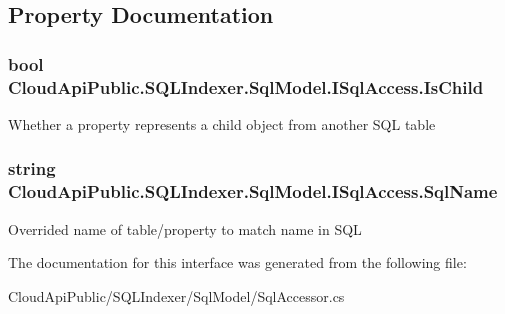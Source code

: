 \subsection{Property Documentation}
\hypertarget{interface_cloud_api_public_1_1_s_q_l_indexer_1_1_sql_model_1_1_i_sql_access_a1fd304ea212e06ebaa3a7c420e6c043d}{
\subsubsection[{Is\-Child}]{\setlength{\rightskip}{0pt plus 5cm}bool Cloud\-Api\-Public.\-S\-Q\-L\-Indexer.\-Sql\-Model.\-I\-Sql\-Access.\-Is\-Child\hspace{0.3cm}{\ttfamily [get]}}}\label{interface_cloud_api_public_1_1_s_q_l_indexer_1_1_sql_model_1_1_i_sql_access_a1fd304ea212e06ebaa3a7c420e6c043d}


Whether a property represents a child object from another S\-Q\-L table 

\hypertarget{interface_cloud_api_public_1_1_s_q_l_indexer_1_1_sql_model_1_1_i_sql_access_adf152d3565c153abd97398874cfe0609}{
\subsubsection[{Sql\-Name}]{\setlength{\rightskip}{0pt plus 5cm}string Cloud\-Api\-Public.\-S\-Q\-L\-Indexer.\-Sql\-Model.\-I\-Sql\-Access.\-Sql\-Name\hspace{0.3cm}{\ttfamily [get]}}}\label{interface_cloud_api_public_1_1_s_q_l_indexer_1_1_sql_model_1_1_i_sql_access_adf152d3565c153abd97398874cfe0609}


Overrided name of table/property to match name in S\-Q\-L 



The documentation for this interface was generated from the following file\-:\begin{DoxyCompactItemize}
\item 
Cloud\-Api\-Public/\-S\-Q\-L\-Indexer/\-Sql\-Model/Sql\-Accessor.\-cs\end{DoxyCompactItemize}
